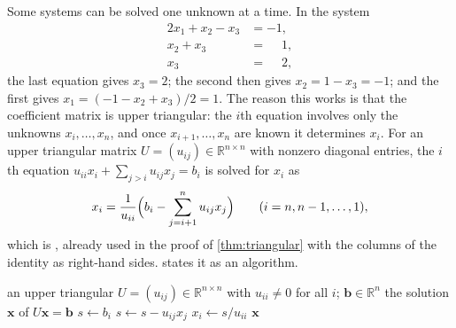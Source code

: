 Some systems can be solved one unknown at a time. In the system
\begin{equation}
\begin{aligned}
2x_1+x_2-x_3&=-1,\\
x_2+x_3&=\phantom{-}1,\\
x_3&=\phantom{-}2,
\end{aligned}
\label{eq:triangular-example}
\end{equation}
the last equation gives $x_3=2$; the second then gives $x_2=1-x_3=-1$; and the first gives $x_1=(-1-x_2+x_3)/2=1$. The reason this works is that the coefficient matrix is upper triangular: the $i$th equation involves only the unknowns $x_i,\ldots,x_n$, and once $x_{i+1},\ldots,x_n$ are known it determines $x_i$. For an upper triangular matrix $U=(u_{ij})\in\mathbb R^{n\times n}$ with nonzero diagonal entries, the $i$th equation $u_{ii}x_i+\sum_{j>i}u_{ij}x_j=b_i$ is solved for $x_i$ as
\begin{equation}
x_i=\frac1{u_{ii}}\Bigl(b_i-\sum_{j=i+1}^nu_{ij}x_j\Bigr)\qquad(i=n,n-1,\ldots,1),
\label{eq:back-substitution}
\end{equation}
which is , already used in the proof of \cref{thm:triangular} with the columns of the identity as right-hand sides.  states it as an algorithm.

\begin{algorithm}
\begin{algorithmic}[1]
\Require an upper triangular $U=(u_{ij})\in\mathbb R^{n\times n}$ with $u_{ii}\ne0$ for all $i$; $\mathbf b\in\mathbb R^n$
\Ensure the solution $\mathbf x$ of $U\mathbf x=\mathbf b$
  \State $s\gets b_i$
    \State $s\gets s-u_{ij}x_j$ 
  \EndFor
  \State $x_i\gets s/u_{ii}$
\EndFor
\State \Return $\mathbf x$
\end{algorithmic}
\caption{Back substitution for an upper triangular system, \eqref{eq:back-substitution}. It uses $n(n-1)/2$ multiplications, as many subtractions and $n$ divisions, $n^2$ operations in all (\cref{prop:triangular-solve}).}
\label{alg:back-substitution}
\end{algorithm}

